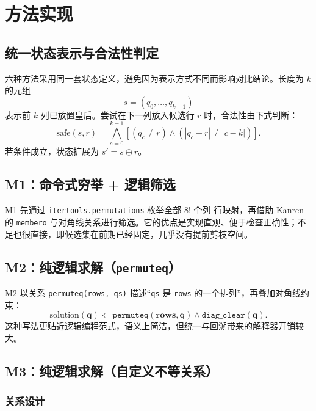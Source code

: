 ﻿\chapter{方法实现}\label{chap:float}

\section{统一状态表示与合法性判定}

六种方法采用同一套状态定义，避免因为表示方式不同而影响对比结论。长度为 $k$ 的元组
\begin{equation}
  s=(q_0,\ldots,q_{k-1})
\end{equation}
表示前 $k$ 列已放置皇后。尝试在下一列放入候选行 $r$ 时，合法性由下式判断：
\begin{equation}
  \text{safe}(s,r)=\bigwedge_{c=0}^{k-1}\left[(q_c\neq r)\land(|q_c-r|\neq |c-k|)\right].
\end{equation}
若条件成立，状态扩展为 $s'=s\oplus r$。

\section{M1：命令式穷举 + 逻辑筛选}

M1 先通过 \texttt{itertools.permutations} 枚举全部 $8!$ 个列-行映射，再借助 Kanren 的 \texttt{membero} 与对角线关系进行筛选。它的优点是实现直观、便于检查正确性；不足也很直接，即候选集在前期已经固定，几乎没有提前剪枝空间。

\section{M2：纯逻辑求解（\texttt{permuteq}）}

M2 以关系 \texttt{permuteq(rows, qs)} 描述“\texttt{qs} 是 \texttt{rows} 的一个排列”，再叠加对角线约束：
\begin{equation}
  \text{solution}(\mathbf{q})\Leftarrow \texttt{permuteq}(\mathbf{rows},\mathbf{q})\land\texttt{diag\_clear}(\mathbf{q}).
\end{equation}
这种写法更贴近逻辑编程范式，语义上简洁，但统一与回溯带来的解释器开销较大。

\section{M3：纯逻辑求解（自定义不等关系）}

\subsection{关系设计}

